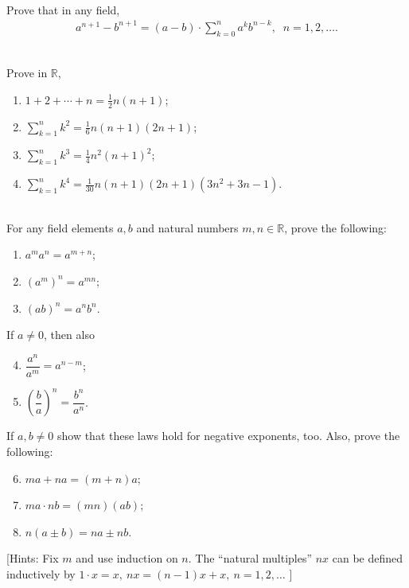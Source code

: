 \documentclass[12pt]{book}
\theoremstyle{definition}
\begin{document}
\begin{ex}[9]
\\
Prove that in any field,
\begin{align*}
	a^{n+1}-b^{n+1}= (a-b)\cdot \sum_{k=0}^n a^kb^{n-k}, \;\; n=1,2, \ldots .
\end{align*}	
\end{ex}
\begin{ex}[10]
\\
Prove in $\mathbb{R}$,
\begin{enumerate}[label=(\roman*)]
	\item $1+2+\cdots+n= \frac{1}{2}n(n+1)$;
	\item $\sum_{k=1}^n k^2 = \frac{1}{6}n(n+1)(2n+1)$;
	\item $\sum_{k=1}^n k^3 = \frac{1}{4}n^2(n+1)^2$;
	\item $\sum_{k=1}^n k^4 = \frac{1}{30}n(n+1)(2n+1)(3n^2+3n-1)$.
\end{enumerate}	
\end{ex}
\begin{ex}[11]
\\
For any field elements $a,b$ and natural numbers $m,n \in \mathbb{R}$, prove the following:
\begin{multicols}{3}
\begin{enumerate}[label=(\roman*)]
	\item $a^ma^n= a^{m+n}$;
	\item $(a^m)^n =a ^{mn}$;
	\item $(ab)^n = a^nb^n$.
\end{enumerate}
\end{multicols}
If $a \neq 0$, then also
\begin{multicols}{2}
\begin{enumerate}[label = (\roman*)]
	\setcounter{enumi}{3}
	\item $\dfrac{a^n}{a^m} = a^{n-m}$; 
	\item $\left( \dfrac{b}{a} \right)^n = \dfrac{b^n}{a^n}$.
\end{enumerate}
\end{multicols}
If $a,b \neq 0$ show that these laws hold for negative exponents, too. Also, prove the following:
\begin{multicols}{3}
\begin{enumerate}[label = (\roman*)]
	\setcounter{enumi}{5}
	\item $ma+na = (m+n)a$;
	\item $ma \cdot nb = (mn)(ab)$;
	\item $n(a\pm b) = na \pm nb$. 
\end{enumerate}
\end{multicols}
[Hints: Fix $m$ and use induction on $n$. The ``natural multiples'' $nx$ can be defined inductively by $1\cdot x= x,\: nx  =(n-1)x +x, \: n=1,2, \ldots$ ]	
\end{ex}
\end{document}
